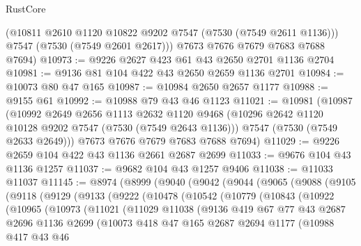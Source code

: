 \begin{lexlean}{RustCore}
\begin{coremodule}
        (@10811 @2610 @1120 @10822 @9202 @7547 (@7530 (@7549 @2611 @1136)))
        @7547
        (@7530 (@7549 @2601 @2617)))
      @7673
      @7676
      @7679
      @7683
      @7688
      @7694)
@10973 := @9226 @2627 @423 @61 @43 @2650 @2701 @1136 @2704
@10981 := @9136 @81 @104 @422 @43 @2650 @2659 @1136 @2701
@10984 := @10073 @80 @47 @165
@10987 := @10984 @2650 @2657 @1177
@10988 := @9155 @61
@10992 := @10988 @79 @43 @46 @1123
@11021 := @10981
    (@10987
      (@10992
        @2649
        @2656
        @1113
        @2632
        @1120
        @9468
        (@10296 @2642 @1120 @10128 @9202 @7547 (@7530 (@7549 @2643 @1136)))
        @7547
        (@7530 (@7549 @2633 @2649)))
      @7673
      @7676
      @7679
      @7683
      @7688
      @7694)
@11029 := @9226 @2659 @104 @422 @43 @1136 @2661 @2687 @2699
@11033 := @9676 @104 @43 @1136 @1257
@11037 := @9682 @104 @43 @1257 @9406
@11038 := @11033 @11037
@11145 := @8974
    (@8999
      (@9040
        (@9042
          (@9044
            (@9065
              (@9088
                (@9105
                  (@9118
                    (@9129
                      (@9133
                        (@9222
                          (@10478
                            (@10542
                              (@10779
                                (@10843
                                  (@10922
                                    (@10965
                                      (@10973
                                        (@11021
                                          (@11029
                                            @11038
                                            (@9136
                                              @419
                                              @67
                                              @77
                                              @43
                                              @2687
                                              @2696
                                              @1136
                                              @2699
                                              (@10073
                                                @418
                                                @47
                                                @165
                                                @2687
                                                @2694
                                                @1177
                                                (@10988
                                                  @417
                                                  @43
                                                  @46

\end{coremodule}
\end{lexlean}
